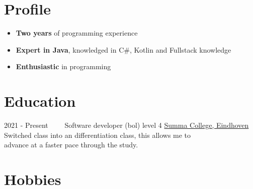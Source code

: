 \documentclass[letterpaper]{twentysecondcv} %
\begin{document}
    \makesidebarFirst %



    \section{Profile}

    \begin{itemize}
        \item \textbf{Two years} of programming experience
        \item \textbf{Expert in Java}, knowledged in C\#, Kotlin and Fullstack knowledge
        \item \textbf{Enthusiastic} in programming
    \end{itemize}

    \vspace{6mm}




    \section{Education}

    \begin{twenty} %
        \twentyitem
        {2021 -}
        {Present~~~~}
        {Software developer (bol) level 4}
        {\href{https://www.summacollege.nl/}{Summa College, Eindhoven}}
        {}
        {
            Switched class into an differentiation class, this allows me to \\ advance at a faster pace through the study.
        }
    \end{twenty}



    \section{Hobbies}
\end{document}
